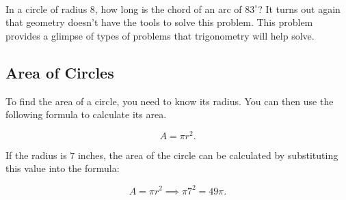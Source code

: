 \begin{example}
  \label{exm:angles_and_arcs_of_a_circle}$ $
  
  \begin{figure}[H]
    \centering


    \label{fig:angles_and_arcs_of_a_circle}
  \end{figure}

  In a circle of radius $8$, how long is the chord of an arc of $83^{\circ}$?
  It turns out again that geometry doesn't have the tools to solve this
  problem. This problem provides a glimpse of types of problems that
  trigonometry will help solve.
\end{example}


\subsection{Area of Circles}
\label{sub_sec:area_of_circles}

To find the area of a circle, you need to know its radius. You can then use the following formula to calculate its area.

\[ A = \pi r^{2} . \]

\begin{example}
  \label{exm:area_of_a_circle}

  If the radius is $7$ inches, the area of the circle can be calculated by
  substituting this value into the formula:

  \[ A = \pi r^{2} \implies \pi 7^{2} = 49\pi . \]
\end{example}




\newpage
